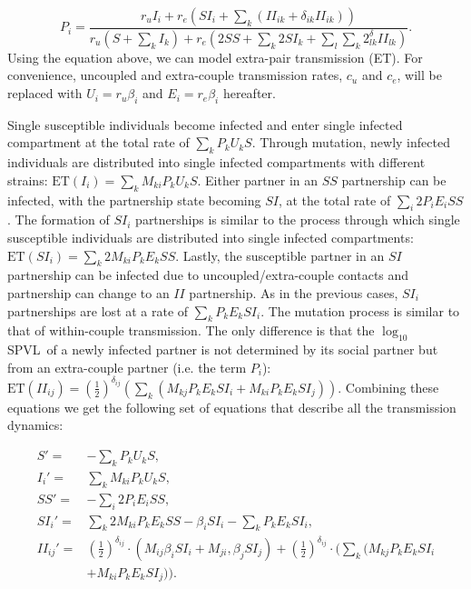 \documentclass[10pt,letterpaper]{article}
\newcommand{\khalf}{\left(\frac{1}{2}\right)^{\delta_{ij}}}  %
\newcommand{\Lspvl}{$\log_{10}$ SPVL}
\newcommand{\ET}{\textrm{ET}}
\begin{document}
\begin{equation}
P_i = \frac{r_u I_i + r_e (SI_i + \sum_k (II_{ik} + \delta_{ik} II_{ik}))}{r_u (S + \sum_k I_k) + r_e(2 SS + \sum_k 2 SI_k + \sum_l \sum_k 2^\delta_{lk} II_{lk} )}.
\end{equation}
Using the equation above, we can model extra-pair transmission (ET). For convenience, uncoupled and extra-couple transmission rates, $c_u$ and $c_e$, will be replaced with $U_i = r_u \beta_i$ and $E_i = r_e \beta_i$ hereafter.

Single susceptible individuals become infected and enter single infected compartment at the total rate of $\sum_k P_k U_k S$. Through mutation, newly infected individuals are distributed into single infected compartments with different strains: $\ET(I_i) = \sum_k M_{ki} P_k U_k S$. Either partner in an $SS$ partnership can be infected, with the partnership state becoming $SI$, at the total rate of $\sum_i 2 P_i E_i SS$. The formation of $SI_i$ partnerships is similar to the process through which single susceptible individuals are distributed into single infected compartments: $\ET(SI_i) = \sum_k 2 M_{ki} P_k E_k SS$. Lastly, the susceptible partner in an $SI$ partnership can be infected due to uncoupled/extra-couple contacts and partnership can change to an $II$ partnership. As in the previous cases, $SI_i$ partnerships are lost at a rate of $\sum_k P_k E_k SI_i$. The mutation process is similar to that of within-couple transmission. The only difference is that the \Lspvl\ of a newly infected partner is not determined by its social partner but from an extra-couple partner (i.e. the term $P_i$): $\ET(II_{ij}) = (\frac{1}{2})^{\delta_{ij}}(\sum_k (M_{kj} P_k E_k SI_i + M_{ki} P_k E_k SI_j))$. Combining these equations we get the following set of equations that describe all the transmission dynamics:

\begin{equation}
\begin{aligned}
S' =& - \sum_k P_k U_k S,\\
I_i' =& \sum_k M_{ki} P_k U_k S,\\
SS' =&  - \sum_i 2 P_i E_i SS, \\
SI_i' =& \sum_k 2 M_{ki} P_k E_k SS - \beta_i SI_i - \sum_k P_k E_k SI_i,\\
II_{ij}' =& \khalf \cdot (M_{ij} \beta_i SI_i + M_{ji}, \beta_j SI_j) + \khalf \cdot (\sum_k (M_{kj} P_k E_k SI_i\\
&+ M_{ki} P_k E_k SI_j)).
\end{aligned}
\end{equation}
\end{document}
